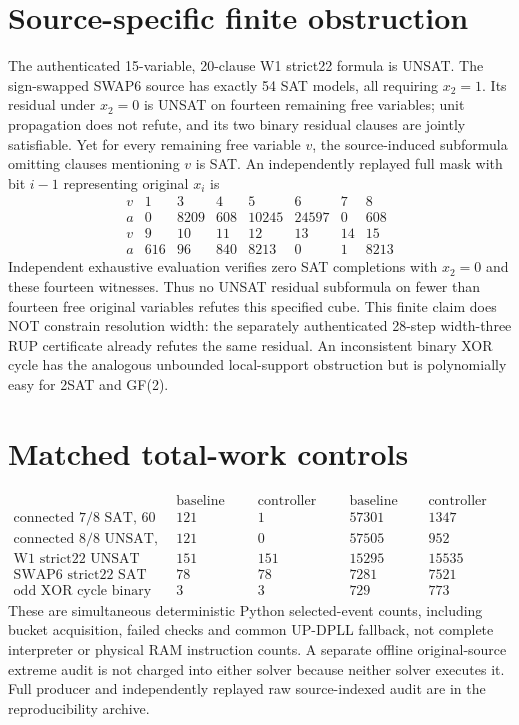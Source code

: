 \documentclass{article}
\begin{document}
\section{Source-specific finite obstruction}
The authenticated 15-variable, 20-clause W1 strict22 formula is UNSAT.
The sign-swapped SWAP6 source has exactly 54 SAT models, all requiring $x_2=1$.
Its residual under $x_2=0$ is UNSAT on fourteen remaining free variables; unit propagation does not refute, and its two binary residual clauses are jointly satisfiable.
Yet for every remaining free variable $v$, the source-induced subformula omitting clauses mentioning $v$ is SAT.
An independently replayed full mask with bit $i-1$ representing original $x_i$ is
\[
\begin{array}{c|rrrrrrr}
v&1&3&4&5&6&7&8\\\hline
a&0&8209&608&10245&24597&0&608\\
v&9&10&11&12&13&14&15\\\hline
a&616&96&840&8213&0&1&8213
\end{array}
\]
Independent exhaustive evaluation verifies zero SAT completions with $x_2=0$ and these fourteen witnesses.
Thus no UNSAT residual subformula on fewer than fourteen free original variables refutes this specified cube.
This finite claim does NOT constrain resolution width: the separately authenticated 28-step width-three RUP certificate already refutes the same residual.
An inconsistent binary XOR cycle has the analogous unbounded local-support obstruction but is polynomially easy for 2SAT and GF(2).
\section{Matched total-work controls}
\[
\begin{array}{l|rrrr}
&\text{baseline nodes}&\text{controller nodes}&\text{baseline work}&\text{controller work}\\\hline
\text{connected 7/8 SAT, 60 variables}&121&1&57301&1347\\
\text{connected 8/8 UNSAT, 60 variables}&121&0&57505&952\\
\text{W1 strict22 UNSAT}&151&151&15295&15535\\
\text{SWAP6 strict22 SAT}&78&78&7281&7521\\
\text{odd XOR cycle binary UNSAT}&3&3&729&773
\end{array}
\]
These are simultaneous deterministic Python selected-event counts, including bucket acquisition, failed checks and common UP-DPLL fallback, not complete interpreter or physical RAM instruction counts.
A separate offline original-source extreme audit is not charged into either solver because neither solver executes it.
Full producer and independently replayed raw source-indexed audit are in the reproducibility archive.
\end{document}
